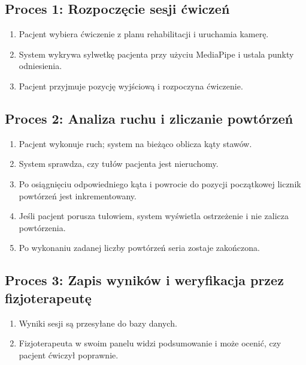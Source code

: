 \documentclass[11pt,a4paper]{article}
\begin{document}
\subsection{Proces 1: Rozpoczęcie sesji ćwiczeń}
\begin{enumerate}
    \item Pacjent wybiera ćwiczenie z planu rehabilitacji i uruchamia kamerę.
    \item System wykrywa sylwetkę pacjenta przy użyciu MediaPipe i ustala punkty odniesienia.
    \item Pacjent przyjmuje pozycję wyjściową i rozpoczyna ćwiczenie.
\end{enumerate}

\subsection{Proces 2: Analiza ruchu i zliczanie powtórzeń}
\begin{enumerate}
    \item Pacjent wykonuje ruch; system na bieżąco oblicza kąty stawów.
    \item System sprawdza, czy tułów pacjenta jest nieruchomy.
    \item Po osiągnięciu odpowiedniego kąta i powrocie do pozycji początkowej licznik powtórzeń jest inkrementowany.
    \item Jeśli pacjent porusza tułowiem, system wyświetla ostrzeżenie i nie zalicza powtórzenia.
    \item Po wykonaniu zadanej liczby powtórzeń seria zostaje zakończona.
\end{enumerate}

\subsection{Proces 3: Zapis wyników i weryfikacja przez fizjoterapeutę}
\begin{enumerate}
    \item Wyniki sesji są przesyłane do bazy danych.
    \item Fizjoterapeuta w swoim panelu widzi podsumowanie i może ocenić, czy pacjent ćwiczył poprawnie.
\end{enumerate}

\end{document}
